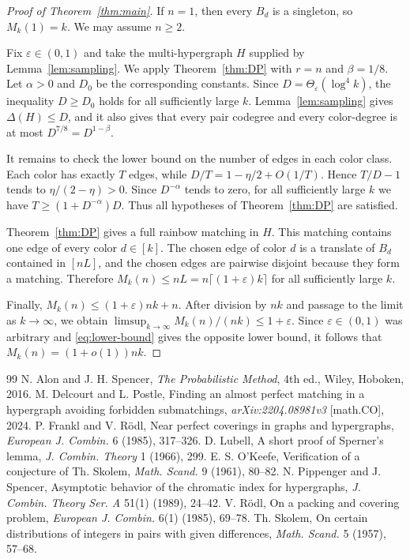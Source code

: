 \documentclass[10pt,a4paper]{amsart}
\numberwithin{equation}{section}
\newcommand{\eps}{\varepsilon}
\begin{document}
\begin{proof}[Proof of Theorem~\ref{thm:main}]
If $n=1$, then every $B_d$ is a singleton, so $M_k(1)=k$.  We may assume
$n\ge2$.

Fix $\eps\in(0,1)$ and take the multi-hypergraph $H$ supplied by
Lemma~\ref{lem:sampling}.  We apply Theorem~\ref{thm:DP} with $r=n$ and
$\beta=1/8$.  Let $\alpha>0$ and $D_0$ be the corresponding constants.  Since
$D=\Theta_\eps(\log^4 k)$, the inequality $D\ge D_0$ holds for all sufficiently
large $k$.  Lemma~\ref{lem:sampling} gives $\Delta(H)\le D$, and it also gives
that every pair codegree and every color-degree is at most
$D^{7/8}=D^{1-\beta}$.

It remains to check the lower bound on the number of edges in each color
class.  Each color has exactly $T$ edges, while
$D/T=1-\eta/2+O(1/T)$.  Hence $T/D-1$ tends to $\eta/(2-\eta)>0$.  Since
$D^{-\alpha}$ tends to zero, for all sufficiently large $k$ we have
$T\ge(1+D^{-\alpha})D$.  Thus all hypotheses of Theorem~\ref{thm:DP} are
satisfied.

Theorem~\ref{thm:DP} gives a full rainbow matching in $H$.  This matching
contains one edge of every color $d\in[k]$.  The chosen edge of color $d$ is a
translate of $B_d$ contained in $[nL]$, and the chosen edges are pairwise
disjoint because they form a matching.  Therefore
$M_k(n)\le nL=n\lceil(1+\eps)k\rceil$ for all sufficiently large $k$.

Finally, $M_k(n)\le(1+\eps)nk+n$.  After division by $nk$ and passage to the
limit as $k\to\infty$, we obtain
$\limsup_{k\to\infty}M_k(n)/(nk)\le1+\eps$.  Since $\eps\in(0,1)$ was
arbitrary and \eqref{eq:lower-bound} gives the opposite lower bound, it follows
that $M_k(n)=(1+o(1))nk$.
\end{proof}


\begin{thebibliography}{99}
 N. Alon and J. H. Spencer, \emph{The Probabilistic Method}, 4th ed., Wiley, Hoboken, 2016.
 M. Delcourt and L. Postle, Finding an almost perfect matching in a hypergraph avoiding forbidden submatchings, \emph{arXiv:2204.08981v3} [math.CO], 2024.
 P. Frankl and V. R\"odl, Near perfect coverings in graphs and hypergraphs, \emph{European J. Combin.} 6 (1985), 317--326.
 D. Lubell, A short proof of Sperner's lemma, \emph{J. Combin. Theory} 1 (1966), 299.
 E. S. O'Keefe, Verification of a conjecture of Th. Skolem, \emph{Math. Scand.} 9 (1961), 80--82.
 N. Pippenger and J. Spencer, Asymptotic behavior of the chromatic index for hypergraphs, \emph{J. Combin. Theory Ser. A} 51(1) (1989), 24--42.
 V. R\"odl, On a packing and covering problem, \emph{European J. Combin.} 6(1) (1985), 69--78.
 Th. Skolem, On certain distributions of integers in pairs with given differences, \emph{Math. Scand.} 5 (1957), 57--68.
\end{thebibliography}
\end{document}
